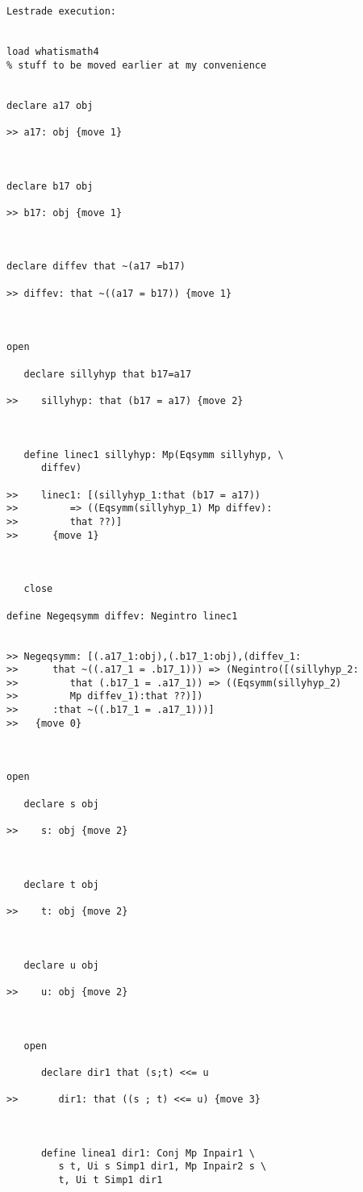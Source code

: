 \documentclass[12pt]{article}
\begin{document}
\begin{verbatim}Lestrade execution:


load whatismath4
% stuff to be moved earlier at my convenience


declare a17 obj

>> a17: obj {move 1}



declare b17 obj

>> b17: obj {move 1}



declare diffev that ~(a17 =b17)

>> diffev: that ~((a17 = b17)) {move 1}



open

   declare sillyhyp that b17=a17

>>    sillyhyp: that (b17 = a17) {move 2}



   define linec1 sillyhyp: Mp(Eqsymm sillyhyp, \
      diffev)

>>    linec1: [(sillyhyp_1:that (b17 = a17))
>>         => ((Eqsymm(sillyhyp_1) Mp diffev):
>>         that ??)]
>>      {move 1}



   close

define Negeqsymm diffev: Negintro linec1


>> Negeqsymm: [(.a17_1:obj),(.b17_1:obj),(diffev_1:
>>      that ~((.a17_1 = .b17_1))) => (Negintro([(sillyhyp_2:
>>         that (.b17_1 = .a17_1)) => ((Eqsymm(sillyhyp_2)
>>         Mp diffev_1):that ??)])
>>      :that ~((.b17_1 = .a17_1)))]
>>   {move 0}



open

   declare s obj

>>    s: obj {move 2}



   declare t obj

>>    t: obj {move 2}



   declare u obj

>>    u: obj {move 2}



   open

      declare dir1 that (s;t) <<= u

>>       dir1: that ((s ; t) <<= u) {move 3}



      define linea1 dir1: Conj Mp Inpair1 \
         s t, Ui s Simp1 dir1, Mp Inpair2 s \
         t, Ui t Simp1 dir1


\end{verbatim}
\end{document}
